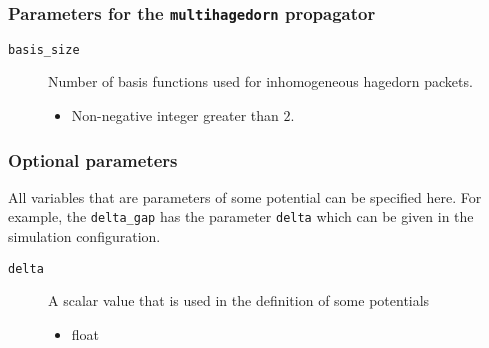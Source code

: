 \documentclass[a4paper,10pt]{report}
\begin{document}
\subsubsection{Parameters for the \texttt{multihagedorn} propagator}

\begin{description}
  \item[\texttt{basis\_size}] Number of basis functions used for inhomogeneous hagedorn packets.
  \begin{itemize}
    \item Non-negative integer greater than $2$.
  \end{itemize}
\end{description}

%
%

\subsubsection{Optional parameters}

All variables that are parameters of some potential can be specified
here. For example, the \texttt{delta\_gap} has the parameter \texttt{delta}
which can be given in the simulation configuration.

\begin{description}
  \item[\texttt{delta}] A scalar value that is used in the definition of some potentials
  \begin{itemize}
    \item float
  \end{itemize}
\end{description}
\end{document}
